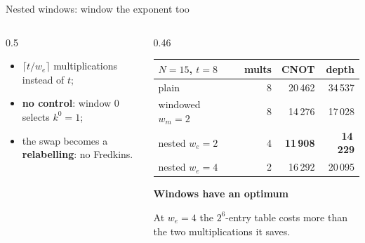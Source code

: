 \documentclass[aspectratio=169,11pt]{beamer}
\newcommand{\peachtitle}[1]{{\bfseries\color{cverm}#1}\par\vskip1mm}
\begin{document}
\setcounter{framenumber}{60}
\begin{frame}{Nested windows: window the exponent too}
  \begin{columns}[c]
    \begin{column}{0.5\textwidth}
      \centering
      \vskip3mm
      \raggedright\small
      \begin{itemize}\setlength{\itemsep}{0.6mm}
        \item $\lceil t/w_e\rceil$ multiplications instead of $t$;
        \item \textbf{no control}: window 0 selects $k^0=1$;
        \item the swap becomes a \textbf{relabelling}: no Fredkins.
      \end{itemize}
    \end{column}
    \begin{column}{0.46\textwidth}
      \centering\footnotesize
      \renewcommand{\arraystretch}{1.1}
      \begin{tabular}{@{}lrrr@{}}
        \toprule
        $N=15$, $t=8$ & mults & CNOT & depth \\
        \midrule
        plain & 8 & 20\,462 & 34\,537 \\
        windowed $w_m=2$ & 8 & 14\,276 & 17\,028 \\
        nested $w_e=2$ & 4 & \textbf{11\,908} & \textbf{14\,229} \\
        nested $w_e=4$ & 2 & 16\,292 & 20\,095 \\
        \bottomrule
      \end{tabular}\par
      \vskip2mm
      \begin{peachblock}[fontupper=\small]\peachtitle{Windows have an optimum}
        At $w_e=4$ the $2^6$-entry table costs more than the two multiplications it saves.
      \end{peachblock}
    \end{column}
  \end{columns}
\end{frame}
\end{document}
